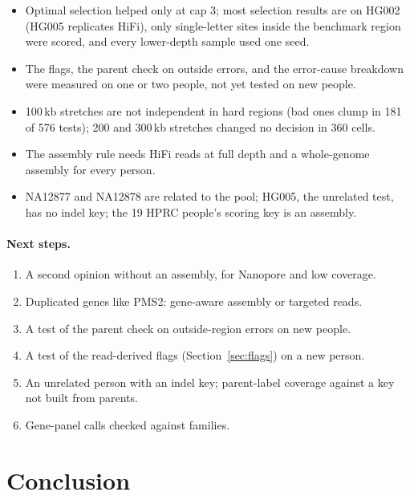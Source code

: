 \documentclass[11pt]{article}
\begin{document}
\begin{itemize}
\item Optimal selection helped only at cap 3; most selection results are on
  HG002 (HG005 replicates HiFi), only single-letter sites inside the
  benchmark region were scored, and every lower-depth sample used one seed.
\item The flags, the parent check on outside errors, and the error-cause
  breakdown were measured on one or two people, not yet tested on new
  people.
\item 100\,kb stretches are not independent in hard regions (bad ones clump
  in 181 of 576 tests); 200 and 300\,kb stretches changed no decision in 360
  cells.
\item The assembly rule needs HiFi reads at full depth and a whole-genome
  assembly for every person.
\item NA12877 and NA12878 are related to the pool; HG005, the unrelated test,
  has no indel key; the 19 HPRC people's scoring key is an assembly.
\end{itemize}

\paragraph{Next steps.}
\begin{enumerate}
\item A second opinion without an assembly, for Nanopore and low coverage.
\item Duplicated genes like PMS2: gene-aware assembly or targeted reads.
\item A test of the parent check on outside-region errors on new people.
\item A test of the read-derived flags
  (Section~\ref{sec:flags}) on a new person.
\item An unrelated person with an indel key; parent-label coverage against a
  key not built from parents.
\item Gene-panel calls checked against families.
\end{enumerate}

\section{Conclusion}\label{sec:summary}
\end{document}
